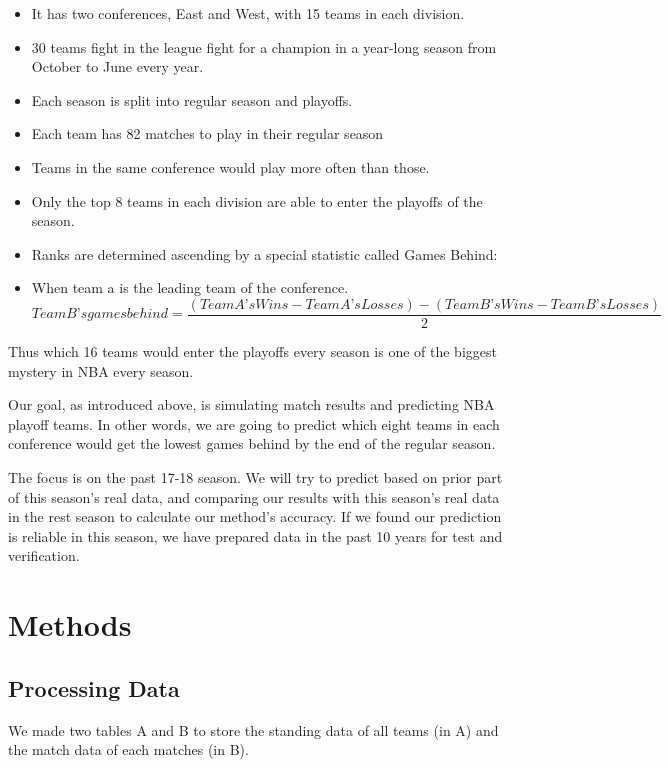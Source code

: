 \documentclass[]{article}
\providecommand{\tightlist}{%
  \setlength{\itemsep}{0pt}\setlength{\parskip}{0pt}}
\begin{document}
\begin{itemize}
\tightlist
\item
  It has two conferences, East and West, with 15 teams in each division.
\item
  30 teams fight in the league fight for a champion in a year-long
  season from October to June every year.
\item
  Each season is split into regular season and playoffs.
\item
  Each team has 82 matches to play in their regular season
\item
  Teams in the same conference would play more often than those.
\item
  Only the top 8 teams in each division are able to enter the playoffs
  of the season.
\item
  Ranks are determined ascending by a special statistic called Games
  Behind:
\item
  When team a is the leading team of the conference.
  \[Team B’s games behind=\frac {(Team A’s Wins-Team A’s Losses)-(Team B’s Wins-Team B’s Losses)}{2}\]
\end{itemize}

Thus which 16 teams would enter the playoffs every season is one of the
biggest mystery in NBA every season.

Our goal, as introduced above, is simulating match results and
predicting NBA playoff teams. In other words, we are going to predict
which eight teams in each conference would get the lowest games behind
by the end of the regular season.

The focus is on the past 17-18 season. We will try to predict based on
prior part of this season's real data, and comparing our results with
this season's real data in the rest season to calculate our method's
accuracy. If we found our prediction is reliable in this season, we have
prepared data in the past 10 years for test and verification.

\section{Methods}\label{methods}

\subsection{Processing Data}\label{processing-data}

We made two tables A and B to store the standing data of all teams (in
A) and the match data of each matches (in B).
\end{document}
